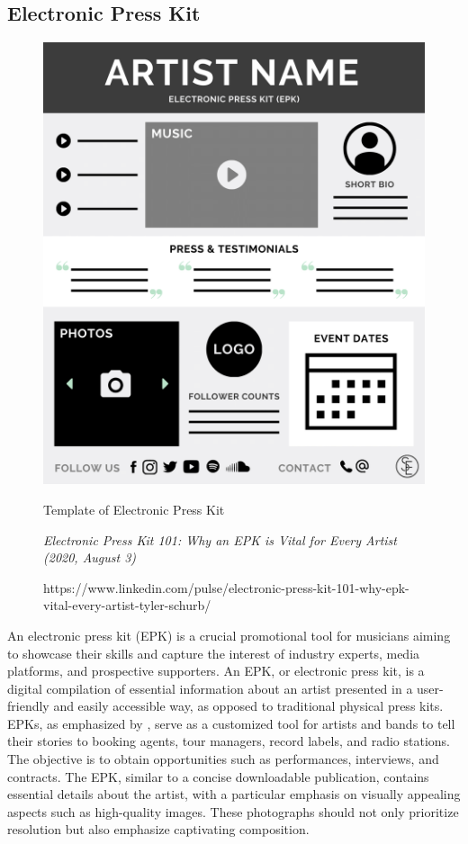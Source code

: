 \subsection{Electronic Press Kit}
\begin{figure}[h]
  \centering
  \includegraphics[width=0.45\linewidth]{mainmatter/images/epk.png}
  \caption{Template of Electronic Press Kit}
  \caption*{\textit{Electronic Press Kit 101: Why an EPK is Vital for Every Artist (2020, August 3)}}
  \caption*{https://www.linkedin.com/pulse/electronic-press-kit-101-why-epk-vital-every-artist-tyler-schurb/}
  \label{fig:myfig29}
\end{figure}
An electronic press kit (EPK) is a crucial promotional tool for musicians aiming to showcase their skills and capture the interest of industry experts, media platforms, and prospective supporters. An EPK, or electronic press kit, is a digital compilation of essential information about an artist presented in a user-friendly and easily accessible way, as opposed to traditional physical press kits. EPKs, as emphasized by \textcite{wilson20}, serve as a customized tool for artists and bands to tell their stories to booking agents, tour managers, record labels, and radio stations. The objective is to obtain opportunities such as performances, interviews, and contracts. The EPK, similar to a concise downloadable publication, contains essential details about the artist, with a particular emphasis on visually appealing aspects such as high-quality images. These photographs should not only prioritize resolution but also emphasize captivating composition. \pagebreak

